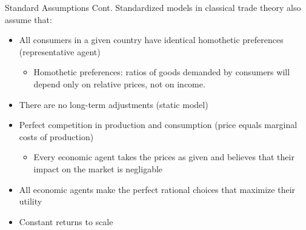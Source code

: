 \documentclass{beamer}
\begin{document}
\begin{frame}{Standard Assumptions Cont.}
 Standardized models in classical trade theory also assume that:
 \begin{itemize} \small
     \item All consumers in a given country have identical homothetic preferences (representative agent)
     \begin{itemize} \scriptsize
         \item Homothetic preferences: ratios of goods demanded by consumers will depend only on relative prices, not on income.
     \end{itemize}
     \item There are no long-term adjustments (static model)
     \item Perfect competition in production and consumption (price equals marginal costs of production)
     \begin{itemize} \scriptsize
         \item Every economic agent takes the prices as given and believes that their impact on the market is negligable
     \end{itemize}
     \item All economic agents make the perfect rational choices that maximize their utility %
     \item Constant returns to scale %

\end{itemize}
\end{frame}
\end{document}
